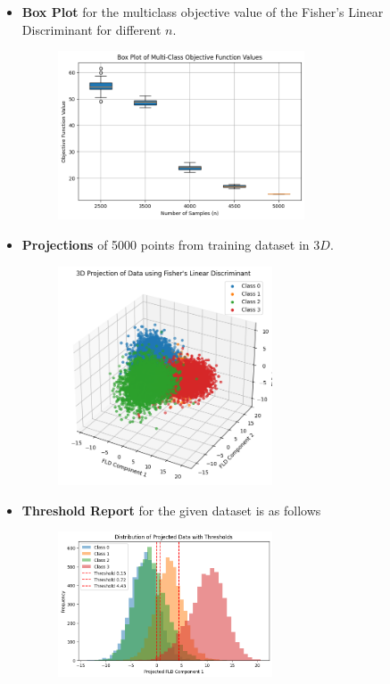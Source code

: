\documentclass{article}
\begin{document}
\begin{itemize}
    \item \textbf{Box Plot} for the multiclass objective value of the Fisher's Linear Discriminant for different $n$.
        \begin{figure}[h]
            \centering
            \includegraphics[width=0.69\textwidth]{BoxPlot.png} 
            \label{fig:box_plot}
        \end{figure}
        
\newpage
        
    
     \item \textbf{Projections} of 5000 points from training dataset in $3D$.
        \begin{figure}[h]
            \centering
            \includegraphics[width=0.6\textwidth]{Projection.png}
            \label{fig:Projection}
        \end{figure}
    \item \textbf{Threshold Report} for the given dataset is as follows
    \begin{figure}[h]
        \centering
        \includegraphics[width=0.6\textwidth]{threshold.png} %
        \label{fig:Threshold}
    \end{figure}
    

\end{itemize}
\end{document}
